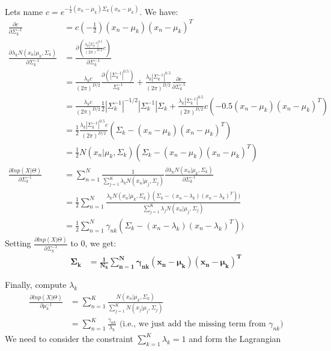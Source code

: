 \documentclass[11pt]{article}
\begin{document}
Lets name $c=e^{-\frac{1}{2}(x_n-\mu_k)\Sigma_k(x_n-\mu_k)}$. We have:
\begin{align*}
\frac{\partial c}{\partial \Sigma^{-1}_k} &= c(-\frac{1}{2})(x_n - \mu_k)(x_n - \mu_k)^T \\
\frac{\partial \lambda_k N(x_n|\mu_k,\Sigma_k)}{\partial\Sigma_k^{-1}} &= \frac{\partial(\frac{\lambda_k|\Sigma_k^{-1}|^{0.5}}{(2 \pi)^{D/2}}c)}{\partial \Sigma^{-1}_k} \\
&= \frac{\lambda_k c}{(2 \pi)^{D/2}}\frac{\partial(|\Sigma_k^{-1}|^{0.5})}{\Sigma_k^{-1}}
+ \frac{\lambda_k |\Sigma_k^{-1}|^{0.5}}{(2 \pi)^{D/2}} \frac{\partial c}{\partial \Sigma_k^{-1}} \\
&=\frac{\lambda_k c}{(2 \pi)^{D/2}}\frac{1}{2}|\Sigma_k^{-1}|^{-1/2} |\Sigma_k^{-1}| \Sigma_k
+ \frac{\lambda_k |\Sigma_k^{-1}|^{0.5}}{(2 \pi)^{D/2}}c{(-0.5(x_n-\mu_k)(x_n-\mu_k)^T)}\\
&= \frac{1}{2} \frac{\lambda_k |\Sigma_k^{-1}|^{0.5}c}{(2 \pi)^{D/2}}(\Sigma_k - (x_n-\mu_k)(x_n-\mu_k)^T)\\
&= \frac{1}{2} N(x_n|\mu_k, \Sigma_k)(\Sigma_k - (x_n-\mu_k)(x_n-\mu_k)^T) \\
\frac{\partial ln p(X|\Theta)}{\partial \Sigma_k^{-1}} &= \sum_{n=1}^N
\frac{1}{\sum_{j=1}^K \lambda_k N(x_n|\mu_j,\Sigma_j)}
\frac{\partial \lambda_k N(x_n|\mu_k,\Sigma_k)}{\partial\Sigma_k^{-1}} \\
&= \frac{1}{2} \sum_{n=1}^N \frac{\lambda_k N(x_n|\mu_k,\Sigma_k)(\Sigma_k-(x_n-\lambda_k)(x_n-\lambda_k)^T))}{\sum_{j=1}^K \lambda_j N(x_n|\mu_j,\Sigma_j)}\\
&=\frac{1}{2}\sum_{n=1}^N\gamma_{nk}(\Sigma_k-(x_n-\lambda_k)(x_n-\lambda_k)^T))
\end{align*}
Setting $\frac{\partial ln p(X|\Theta)}{\partial \Sigma_k^{-1}}$ to 0, we get:
\begin{align*}
\bm{\Sigma _k} &= \bm{\frac{1}{N_k} \sum _{n=1}^N \gamma _{nk}(x_n-\mu _k)(x_n-\mu _k)^T}
\end{align*}

Finally, compute $\lambda_k$
\begin{align*}
\frac{\partial ln p(X|\Theta)}{\partial \mu_k^{-1}} &= \sum_{n=1}^K \frac{N(x_n|\mu_k,\Sigma_k)}{\sum_{j=1}^K N(x_j|\mu_j,\Sigma_j)} \\
&= \sum_{n=1}^K \frac{\gamma_{nk}}{\lambda_k} \text{~(i.e., we just add the missing term from~} \gamma_{nk})
\end{align*}
We need to consider the constraint $\sum_{k=1}^K \lambda_k=1$ and form the Lagrangian
\end{document}
